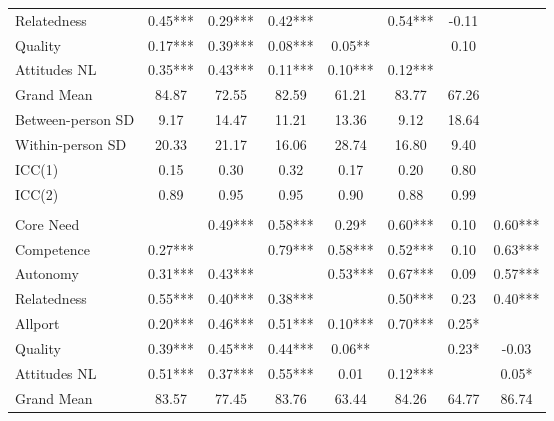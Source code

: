 \begin{tabular}[t]{lccccccc}
\hspace{1em}Relatedness & 0.45*** & 0.29*** & 0.42*** &  & 0.54*** & -0.11 & \\
\hspace{1em}Quality & 0.17*** & 0.39*** & 0.08*** & 0.05** &  & 0.10 & \\
\hspace{1em}Attitudes NL & 0.35*** & 0.43*** & 0.11*** & 0.10*** & 0.12*** &  & \\
\addlinespace
\hspace{1em}Grand Mean & 84.87 & 72.55 & 82.59 & 61.21 & 83.77 & 67.26 & \\
\hspace{1em}Between-person SD & 9.17 & 14.47 & 11.21 & 13.36 & 9.12 & 18.64 & \\
\hspace{1em}Within-person SD & 20.33 & 21.17 & 16.06 & 28.74 & 16.80 & 9.40 & \\
\hspace{1em}ICC(1) & 0.15 & 0.30 & 0.32 & 0.17 & 0.20 & 0.80 & \\
\hspace{1em}ICC(2) & 0.89 & 0.95 & 0.95 & 0.90 & 0.88 & 0.99 & \\
\addlinespace[0.3em]
\multicolumn{8}{l}{\textbf{Study 3}}\\
\hspace{1em}Core Need &  & 0.49*** & 0.58*** & 0.29* & 0.60*** & 0.10 & 0.60***\\
\hspace{1em}Competence & 0.27*** &  & 0.79*** & 0.58*** & 0.52*** & 0.10 & 0.63***\\
\hspace{1em}Autonomy & 0.31*** & 0.43*** &  & 0.53*** & 0.67*** & 0.09 & 0.57***\\
\hspace{1em}Relatedness & 0.55*** & 0.40*** & 0.38*** &  & 0.50*** & 0.23 & 0.40***\\
\hspace{1em}Allport & 0.20*** & 0.46*** & 0.51*** & 0.10*** & 0.70*** & 0.25* & \\
\hspace{1em}Quality & 0.39*** & 0.45*** & 0.44*** & 0.06** &  & 0.23* & -0.03\\
\hspace{1em}Attitudes NL & 0.51*** & 0.37*** & 0.55*** & 0.01 & 0.12*** &  & 0.05*\\
\addlinespace
\hspace{1em}Grand Mean & 83.57 & 77.45 & 83.76 & 63.44 & 84.26 & 64.77 & 86.74\\

\end{tabular}
